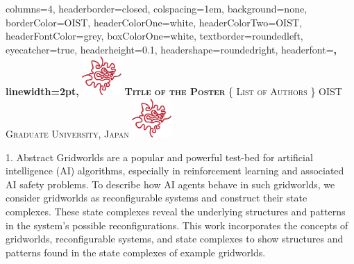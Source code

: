 \documentclass[
    a0paper, %
    landscape, %
    fontscale=0.3 %
    ]{baposter}
\begin{document}
\begin{poster}{ %
    columns=4, %
    headerborder=closed, %
    colspacing=1em, %
    background=none, %
    borderColor=OIST, %
    headerColorOne=white, %
    headerColorTwo=OIST, %
    headerFontColor=grey, %
    boxColorOne=white, %
    textborder=roundedleft, %
    eyecatcher=true, %
    headerheight=0.1\textheight, %
    headershape=roundedright, %
    headerfont=\Large\bf\textsc, %
    linewidth=2pt, %
} 
{\includegraphics[height=4em]{logo.jpg}} %
{\bf\textsc{Title of the Poster}\vspace{0.5em}} %
{\textsc{\{ List of Authors \} \hspace{12pt} OIST Graduate University, Japan}} %
{\includegraphics[height=4em]{logo.jpg}} %




\begin{posterbox}[
    name = abstract,  %
    column = 0, %
    ]{1. Abstract}
Gridworlds are a popular and powerful test-bed for artificial intelligence (AI) algorithms, especially in reinforcement learning and associated AI safety problems. To describe how AI agents behave in such gridworlds, we consider gridworlds as reconfigurable systems and construct their state complexes. These state complexes reveal the underlying structures and patterns in the system's possible reconfigurations. This work incorporates the concepts of gridworlds, reconfigurable systems, and state complexes to show structures and patterns found in the state complexes of example gridworlds.


\end{posterbox}
\end{poster}
\end{document}
